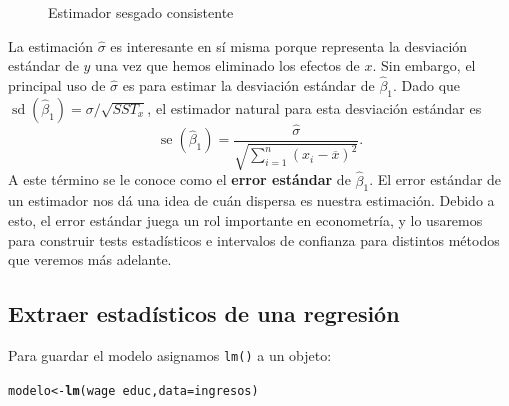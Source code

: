 \documentclass[12pt]{report}\usepackage[]{graphicx}\usepackage[]{color}
\makeatletter
\newcommand{\hlopt}[1]{\textcolor[rgb]{0,0,0}{#1}}%
\newcommand{\hlstd}[1]{\textcolor[rgb]{0.345,0.345,0.345}{#1}}%
\newcommand{\hlkwb}[1]{\textcolor[rgb]{0.69,0.353,0.396}{#1}}%
\newcommand{\hlkwc}[1]{\textcolor[rgb]{0.333,0.667,0.333}{#1}}%
\newcommand{\hlkwd}[1]{\textcolor[rgb]{0.737,0.353,0.396}{\textbf{#1}}}%
\newenvironment{kframe}{%
 \def\at@end@of@kframe{}%
 \ifinner\ifhmode%
  \def\at@end@of@kframe{\end{minipage}}%
  \begin{minipage}{\columnwidth}%
 \fi\fi%
 \def\FrameCommand##1{\hskip\@totalleftmargin \hskip-\fboxsep
 \colorbox{shadecolor}{##1}\hskip-\fboxsep
     \hskip-\linewidth \hskip-\@totalleftmargin \hskip\columnwidth}%
 \MakeFramed {\advance\hsize-\width
   \@totalleftmargin\z@ \linewidth\hsize
   \@setminipage}}%
 {\par\unskip\endMakeFramed%
 \at@end@of@kframe}
\newenvironment{knitrout}{}{} %
\newcommand*{\kw}[1]{\textbf{#1}\index{#1}}
\newcommand{\sd}{\operatorname{sd}}
\newcommand{\se}{\operatorname{se}}
\makeatother
\begin{document}
\begin{figure}[htb]
  \centering
  \caption{Estimador sesgado consistente}
  \label{fig:estimador_sesgado_consistente}
\end{figure}%

La estimación $\hat\sigma$ es interesante en sí misma porque representa la desviación estándar de $y$ una vez que hemos eliminado los efectos de $x$.
Sin embargo, el principal uso de $\hat\sigma$ es para estimar la desviación estándar de $\hat\beta_1$.
Dado que $\sd(\hat\beta_1) = \sigma / \sqrt{SST_x}$, el estimador natural para esta desviación estándar es
\begin{equation}
\se(\hat\beta_1) = \frac{\hat\sigma}{\sqrt{\sum_{i=1}^n(x_i - \overline x)^2}}.
\end{equation}
A este término se le conoce como el \kw{error estándar} de $\hat\beta_1$.
El error estándar de un estimador nos dá una idea de cuán dispersa es nuestra estimación. Debido a esto, el error estándar juega un rol importante en econometría, y lo usaremos para construir tests estadísticos e intervalos de confianza para distintos métodos que veremos más adelante.


\hrulefill

\subsection{Extraer estadísticos de una regresión}

Para guardar el modelo asignamos \verb|lm()| a un objeto:

\begin{knitrout}
\color{fgcolor}\begin{kframe}
\begin{alltt}
\hlstd{modelo} \hlkwb{<-} \hlkwd{lm}\hlstd{(wage} \hlopt{~} \hlstd{educ,} \hlkwc{data} \hlstd{= ingresos)}
\end{alltt}
\end{kframe}
\end{knitrout}
\end{document}
